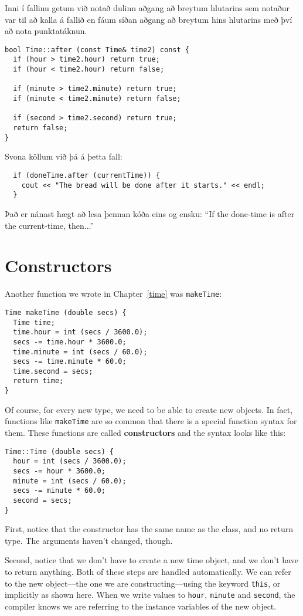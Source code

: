 {Inni í fallinu getum við notað dulinn aðgang að breytum hlutarins sem notaður var til að kalla á fallið en fáum síðan aðgang að breytum hins hlutarins með því að nota punktatáknun.

\begin{verbatim}
bool Time::after (const Time& time2) const {
  if (hour > time2.hour) return true;
  if (hour < time2.hour) return false;

  if (minute > time2.minute) return true;
  if (minute < time2.minute) return false;

  if (second > time2.second) return true;
  return false;
}
\end{verbatim}
%
Svona köllum við þá á þetta fall:

\begin{verbatim}
  if (doneTime.after (currentTime)) {
    cout << "The bread will be done after it starts." << endl;
  }
\end{verbatim}
%
Það er nánast hægt að lesa þennan kóða eins og ensku:
``If the done-time is after the current-time, then...''

\section{Constructors}

Another function we wrote in Chapter~\ref{time} was
{\tt makeTime}:

\begin{verbatim}
Time makeTime (double secs) {
  Time time;
  time.hour = int (secs / 3600.0);
  secs -= time.hour * 3600.0;
  time.minute = int (secs / 60.0);
  secs -= time.minute * 60.0;
  time.second = secs;
  return time;
}
\end{verbatim}
%
Of course, for every new type, we need to be able to create
new objects.  In fact, functions like {\tt makeTime} are so
common that there is a special function syntax for them.  These
functions are called {\bf constructors} and the syntax looks
like this:

\begin{verbatim}
Time::Time (double secs) {
  hour = int (secs / 3600.0);
  secs -= hour * 3600.0;
  minute = int (secs / 60.0);
  secs -= minute * 60.0;
  second = secs;
}
\end{verbatim}
%
First, notice that the constructor has the same name as the
class, and no return type.  The arguments haven't changed, though.

Second, notice that we don't have to create a new time object,
and we don't have to return anything.  Both of these steps are
handled automatically.  We can refer to the new object---the one
we are constructing---using the keyword {\tt this}, or implicitly
as shown here.  When we write values to {\tt hour}, {\tt minute}
and {\tt second}, the compiler knows we are referring to the instance
variables of the new object.

}
